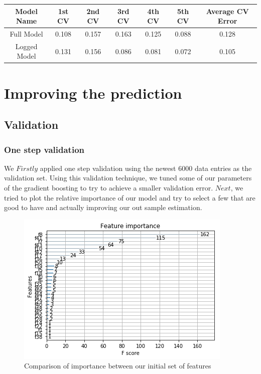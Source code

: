 \documentclass{article}
\begin{document}
\begin{center}
 \begin{tabular}{||c c c c c c c||} 
 \hline
 Model Name & 1st CV & 2nd CV & 3rd CV & 4th CV & 5th CV & Average CV Error \\ [0.5ex] 
 \hline\hline
 Full Model & 0.108 & 0.157 & 0.163 & 0.125 & 0.088 & 0.128 \\ 
 \hline
 Logged Model & 0.131 & 0.156 & 0.086 & 0.081 & 0.072 & 0.105 \\ [1ex] 
 \hline
\end{tabular}
\end{center}


\section{Improving the prediction}
\subsection{Validation}
\subsubsection{One step validation}
We $Firstly$ applied one step validation using the newest 6000 data entries as the validation set. Using this validation technique, we tuned some of our parameters of the gradient boosting to try to achieve a smaller validation error. $Next$, we tried to plot the relative importance of our model and try to select a few that are good to have and actually improving our out sample estimation. 

\begin{figure}[h]
	\centering
	\includegraphics[scale=0.5]{comparison_between_features.png}
	\caption{Comparison of importance between our initial set of features}
\end{figure}
\end{document}
